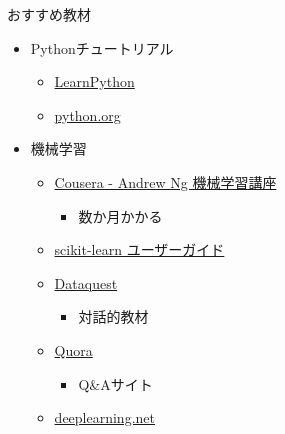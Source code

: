 \documentclass[aspectratio=169, dvipdfmx, 14pt, xcolor={svgnames,dvipsnames}]{beamer}
\def\tightlist{\itemsep1pt\parskip0pt\parsep0pt}
\begin{document}
\begin{frame}{おすすめ教材}
  \begin{itemize}
    \tightlist
    \item
          Pythonチュートリアル

          \begin{itemize}
            \tightlist
            \item
                  \href{https://www.learnpython.org/}{LearnPython}
            \item
                  \href{https://docs.python.org/3/tutorial/}{python.org}
          \end{itemize}
    \item
          機械学習

          \begin{itemize}
            \tightlist
            \item
                  \href{https://www.coursera.org/learn/machine-learning}{Cousera -
                    Andrew Ng 機械学習講座}

                  \begin{itemize}
                    \tightlist
                    \item
                          数か月かかる
                  \end{itemize}
            \item
                  \href{https://scikit-learn.org/skdoc}{scikit-learn ユーザーガイド}
            \item
                  \href{https://www.dataquest.io/}{Dataquest}

                  \begin{itemize}
                    \tightlist
                    \item
                          対話的教材
                  \end{itemize}
            \item
                  \href{https://jp.quora.com/search?q=Machine\%20Learning}{Quora}

                  \begin{itemize}
                    \tightlist
                    \item
                          Q\&Aサイト
                  \end{itemize}
            \item
                  \href{https://sites.google.com/site/minggaoshomepage/links/dee}{deeplearning.net}
          \end{itemize}
  \end{itemize}
\end{frame}
\end{document}
